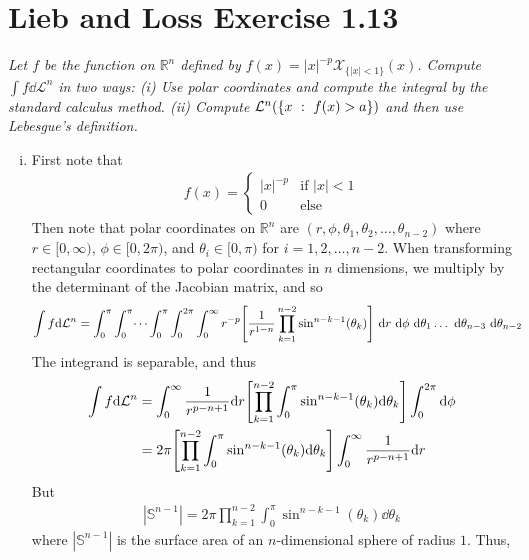 \documentclass[12pt]{article}
\theoremstyle{plain}
\begin{document}
\section*{Lieb and Loss Exercise 1.13}
\emph{Let $f$ be the function on $\mathbb{R}^n$ defined by $f(x) = |x|^{-p}\mathcal{X}_{\{|x| < 1\}}(x)$.  Compute $\int f \dd \mathcal{L}^n$ in two ways: (i) Use polar coordinates and compute the integral by the standard calculus method.  (ii) Compute $\mathcal{L}^n\qty(\{x\ :\ f(x) > a\})$ and then use Lebesgue's definition.}
\begin{enumerate}[(i)]
    \item
        First note that
        \begin{align*}
            f(x) =
            \begin{cases} 
                |x|^{-p} & \text{if $|x| < 1$} \\
                0 & \text{else}
            \end{cases}
        \end{align*}
        Then note that polar coordinates on $\mathbb{R}^n$ are $(r, \phi, \theta_1, \theta_2, \dots, \theta_{n-2})$ where $r \in [0, \infty)$, $\phi \in [0, 2\pi)$, and $\theta_i \in [0, \pi)$ for $i = 1, 2, \dots, n - 2$.  When transforming rectangular coordinates to polar coordinates in $n$ dimensions, we multiply by the determinant of the Jacobian matrix, and so
        \begin{align*}
            \int f \dd \mathcal{L}^n &= \int_0^\pi \int_0^\pi \dots \int_0^\pi \int_0^{2\pi} \int_0^\infty r^{-p} \qty[\frac{1}{r^{1-n}}\prod_{k=1}^{n-2} \sin^{n-k-1}(\theta_{k})]\ \dd r\ \dd \phi\ \dd \theta_1 \dots\ \dd \theta_{n-3}\ \dd \theta_{n-2}
        \end{align*}
        The integrand is separable, and thus
        \begin{align*}
            \int f \dd \mathcal{L}^n &= \int_0^\infty \frac{1}{r^{p-n+1}} \dd r\qty[\prod_{k=1}^{n-2}\int_0^\pi \sin^{n-k-1}(\theta_k)\dd \theta_k] \int_0^{2\pi}\dd \phi \\
            &= 2\pi \qty[\prod_{k=1}^{n-2}\int_0^\pi \sin^{n-k-1}(\theta_k)\dd \theta_k] \int_0^\infty \frac{1}{r^{p-n+1}} \dd r
        \end{align*}
        But
        \begin{align*}
            \left|\mathbb{S}^{n-1}\right| = 2\pi\prod_{k=1}^{n-2}\int_0^\pi \sin^{n-k-1}(\theta_k)\dd \theta_k
        \end{align*}
        where $|\mathbb{S}^{n-1}|$ is the surface area of an $n$-dimensional sphere of radius $1$.  Thus,

\end{enumerate}
\end{document}
